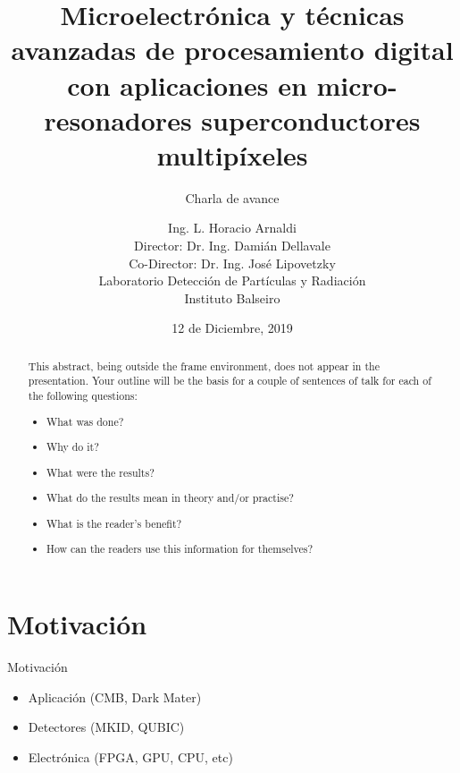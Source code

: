 \documentclass[ignorenonframetext,12pt]{beamer}
\title{Microelectrónica y técnicas avanzadas de procesamiento digital con
aplicaciones en micro-resonadores superconductores multipíxeles}
\subtitle{\alert{Charla de avance}}
\author{Ing. L. Horacio Arnaldi\\
Director: Dr. Ing. Damián Dellavale\\
Co-Director: Dr. Ing. José Lipovetzky\\
\vspace{0.6cm}
Laboratorio Detecci\'on de Part\'iculas y Radiaci\'on\\
Instituto Balseiro}
\date{12 de Diciembre, 2019}
\begin{document}
\begin{frame}
				\maketitle
\end{frame}

\begin{abstract}
				This abstract, being outside the frame environment, does not appear in
				the presentation.  Your outline will be the basis for a couple of
				sentences of talk for each of the following questions:
				\begin{itemize}
								\item What was done?
								\item Why do it?
								\item What were the results?
								\item What do the results mean in theory and/or practise?
								\item What is the reader's benefit?
								\item How can the readers use this information for themselves? 
				\end{itemize}
\end{abstract}


\section{Motivación}
\begin{frame}{Motivación}
				\begin{itemize}
								\item Aplicación (CMB, Dark Mater)
								\item Detectores (MKID, QUBIC)
								\item Electrónica (FPGA, GPU, CPU, etc)
				\end{itemize}
\end{frame}
\end{document}
